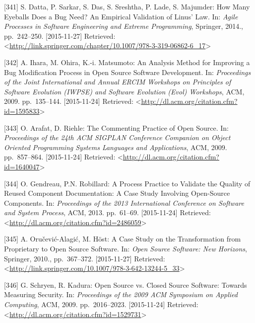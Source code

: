 \documentclass[12pt,magyar,a4paper,oneside]{scrreprt}
\begin{document}
\leavevmode\hypertarget{ref-datta_how_2014}{}%
{[}341{]} S. Datta, P. Sarkar, S. Das, S. Sreshtha, P. Lade, S.
Majumder: How Many Eyeballs Does a Bug Need? An Empirical Validation of
Linus' Law. In: \emph{Agile Processes in Software Engineering and
Extreme Programming}, Springer, 2014., pp.~242--250. {[}2015-11-27{]}
Retrieved:
\textless{}\url{http://link.springer.com/chapter/10.1007/978-3-319-06862-6_17}\textgreater{}

\leavevmode\hypertarget{ref-ihara_analysis_2009}{}%
{[}342{]} A. Ihara, M. Ohira, K.-i. Matsumoto: An Analysis Method for
Improving a Bug Modification Process in Open Source Software
Development. In: \emph{Proceedings of the Joint International and Annual
ERCIM Workshops on Principles of Software Evolution (IWPSE) and Software
Evolution (Evol) Workshops}, ACM, 2009. pp.~135--144. {[}2015-11-24{]}
Retrieved:
\textless{}\url{http://dl.acm.org/citation.cfm?id=1595833}\textgreater{}

\leavevmode\hypertarget{ref-arafat_commenting_2009}{}%
{[}343{]} O. Arafat, D. Riehle: The Commenting Practice of Open Source.
In: \emph{Proceedings of the 24th ACM SIGPLAN Conference Companion on
Object Oriented Programming Systems Languages and Applications}, ACM,
2009. pp.~857--864. {[}2015-11-24{]} Retrieved:
\textless{}\url{http://dl.acm.org/citation.cfm?id=1640047}\textgreater{}

\leavevmode\hypertarget{ref-gendreau_process_2013}{}%
{[}344{]} O. Gendreau, P.N. Robillard: A Process Practice to Validate
the Quality of Reused Component Documentation: A Case Study Involving
Open-Source Components. In: \emph{Proceedings of the 2013 International
Conference on Software and System Process}, ACM, 2013. pp.~61--69.
{[}2015-11-24{]} Retrieved:
\textless{}\url{http://dl.acm.org/citation.cfm?id=2486059}\textgreater{}

\leavevmode\hypertarget{ref-orucevic-alagic_case_2010}{}%
{[}345{]} A. Oručević-Alagić, M. Höst: A Case Study on the
Transformation from Proprietary to Open Source Software. In: \emph{Open
Source Software: New Horizons}, Springer, 2010., pp.~367--372.
{[}2015-11-27{]} Retrieved:
\textless{}\url{http://link.springer.com/10.1007/978-3-642-13244-5_33}\textgreater{}

\leavevmode\hypertarget{ref-schryen_open_2009}{}%
{[}346{]} G. Schryen, R. Kadura: Open Source vs. Closed Source Software:
Towards Measuring Security. In: \emph{Proceedings of the 2009 ACM
Symposium on Applied Computing}, ACM, 2009. pp.~2016--2023.
{[}2015-11-24{]} Retrieved:
\textless{}\url{http://dl.acm.org/citation.cfm?id=1529731}\textgreater{}
\end{document}
